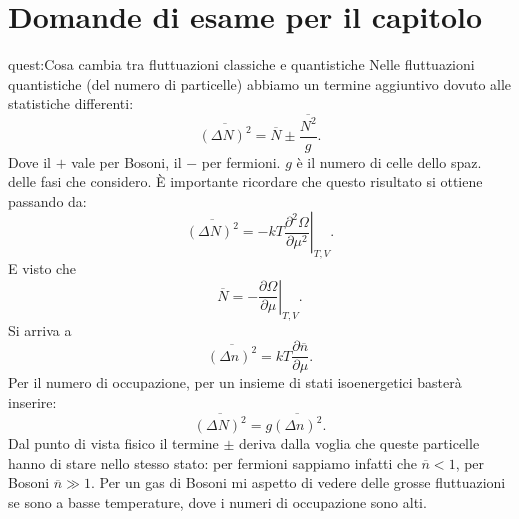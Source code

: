 \clearpage 
\section*{Domande di esame per il capitolo}%
\begin{quest}{quest:Cosa cambia tra fluttuazioni classiche e quantistiche}
    Nelle fluttuazioni quantistiche (del numero di particelle) abbiamo un termine aggiuntivo dovuto alle statistiche differenti:
    \[
        \overline{\left(\Delta N\right)^2} = \overline{N}\pm \frac{\overline{N^2}}{g}
    .\] 
    Dove il $+$  vale per Bosoni, il $-$  per fermioni. $g$  è il numero di celle dello spaz. delle fasi che considero. È importante ricordare che questo risultato si ottiene passando da:
    \[
        \overline{\left(\Delta N\right)^2} = -kT \left.\frac{\partial ^2 \Omega}{\partial \mu^2} \right|_{T,V}
    .\] 
    E visto che 
    \[
        \overline{N} = -\left.\frac{\partial \Omega}{\partial \mu} \right|_{T,V}
    .\] 
    Si arriva a 
    \[
        \overline{\left(\Delta n\right)^2}= kT\frac{\partial \overline{n}}{\partial \mu} 
    .\] 
    Per il numero di occupazione, per un insieme di stati isoenergetici basterà inserire:
    \[
        \overline{\left(\Delta N\right)^2} = g \overline{\left(\Delta n\right)^2}
    .\] 
    Dal punto di vista fisico il termine $\pm$ deriva dalla voglia che queste particelle hanno di stare nello stesso stato: per fermioni sappiamo infatti che $\overline{n}< 1$, per Bosoni $\overline{n}\gg 1$. 
    Per un gas di Bosoni mi aspetto di vedere delle grosse fluttuazioni se sono a basse temperature, dove i numeri di occupazione sono alti.
\end{quest}

